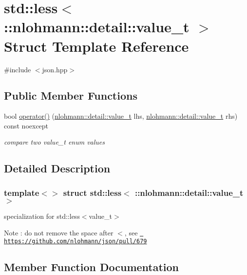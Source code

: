 \hypertarget{structstd_1_1less_3_01_1_1nlohmann_1_1detail_1_1value__t_01_4}{}\section{std\+::less$<$ \+::nlohmann\+::detail\+::value\+\_\+t $>$ Struct Template Reference}
\label{structstd_1_1less_3_01_1_1nlohmann_1_1detail_1_1value__t_01_4}


{\ttfamily \#include $<$json.\+hpp$>$}

\subsection*{Public Member Functions}
\begin{DoxyCompactItemize}
\item 
bool \mbox{\hyperlink{structstd_1_1less_3_01_1_1nlohmann_1_1detail_1_1value__t_01_4_a76d2a6c170cfd74f3b1882be1b5a6671}{operator()}} (\mbox{\hyperlink{namespacenlohmann_1_1detail_a1ed8fc6239da25abcaf681d30ace4985}{nlohmann\+::detail\+::value\+\_\+t}} lhs, \mbox{\hyperlink{namespacenlohmann_1_1detail_a1ed8fc6239da25abcaf681d30ace4985}{nlohmann\+::detail\+::value\+\_\+t}} rhs) const noexcept
\begin{DoxyCompactList}\small\item\em compare two value\+\_\+t enum values \end{DoxyCompactList}\end{DoxyCompactItemize}


\subsection{Detailed Description}
\subsubsection*{template$<$$>$\newline
struct std\+::less$<$ \+::nlohmann\+::detail\+::value\+\_\+t $>$}

specialization for std\+::less$<$value\+\_\+t$>$ \begin{DoxyNote}{Note}
\+: do not remove the space after \textquotesingle{}$<$\textquotesingle{}, see \href{https://github.com/nlohmann/json/pull/679}{\texttt{ https\+://github.\+com/nlohmann/json/pull/679}} 
\end{DoxyNote}


\subsection{Member Function Documentation}
\mbox{\label{structstd_1_1less_3_01_1_1nlohmann_1_1detail_1_1value__t_01_4_a76d2a6c170cfd74f3b1882be1b5a6671}} 
